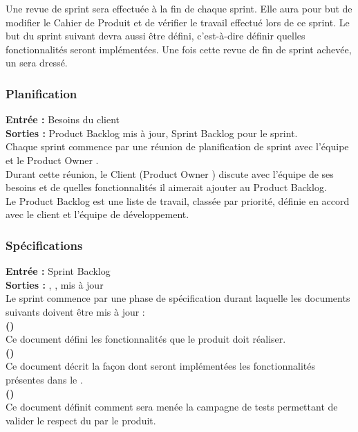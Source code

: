Une revue de sprint sera effectuée à la fin de chaque sprint. Elle aura pour but de modifier le Cahier de Produit et de vérifier le travail effectué lors de ce sprint. Le but du sprint suivant devra aussi être défini, c’est-à-dire définir quelles fonctionnalités seront implémentées. Une fois cette revue de fin de sprint achevée, un \PV{} sera dressé.



\subsubsection{Planification}

\textbf{Entrée :} Besoins du client \\
\textbf{Sorties :} Product Backlog mis à jour, Sprint Backlog pour le sprint.\\
Chaque sprint commence par une réunion de planification de sprint avec l’équipe et le Product Owner . \\
Durant cette réunion, le Client (Product Owner ) discute avec l’équipe de ses besoins et de quelles fonctionnalités il aimerait ajouter au Product Backlog. \\
Le Product Backlog est une liste de travail, classée par priorité, définie en accord avec le client et l'équipe de développement.
\subsubsection{Spécifications}
\label{specification}
\textbf{Entrée :} Sprint Backlog \\
\textbf{Sorties :} \DSECourt , \DSICourt , \PTVCourt{} mis à jour \\
Le sprint commence par une phase de spécification durant laquelle les documents suivants doivent être mis à jour : \\

\textbf{\DSE (\DSECourt)} \\
Ce document défini les fonctionnalités que le produit doit réaliser.\\

\textbf{\DSI (\DSICourt)} \\
Ce document décrit la façon dont seront implémentées les fonctionnalités présentes dans le \DSECourt.\\
\textbf{\PTV (\PTVCourt)} \\
Ce document définit comment sera menée la campagne de tests permettant de valider le respect du \DSECourt{} par le produit. \\


